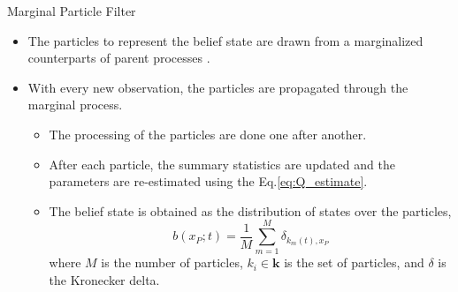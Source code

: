 \documentclass[
english,%
aspectratio=169,%
color={accentcolor=3b},
logo=true,%
colorframetitle=false,%
]{tudabeamer}
\begin{document}
\begin{frame}{Marginal Particle Filter}
\begin{itemize}
\item The particles to represent the belief state are drawn from a marginalized counterparts of parent processes \cite{Studer2016}.
\item With every new observation, the particles are propagated through the marginal process.
\begin{itemize}
\item The processing of the particles are done one after another. 
\item After each particle, the summary statistics are updated and the parameters are re-estimated using the Eq.\autoref{eq:Q_estimate}. 
\item The belief state is obtained as the distribution of states over the particles,
\begin{equation}
b(x_P; t) = \frac{1}{M} \sum_{m=1}^{M} \delta_{k_m(t), x_P}
\end{equation}
where $ M $ is the number of particles, $ k_i \in \textbf{k} $ is the set of particles, and $\delta$ is the Kronecker delta.
\end{itemize}
\end{itemize}
\end{frame}
\end{document}
